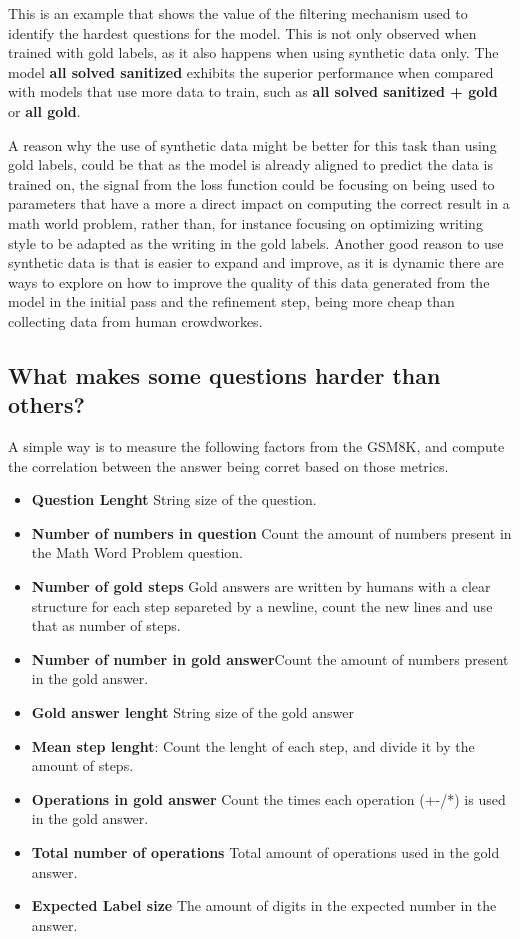 \documentclass[a4paper,10pt]{article}
\begin{document}
This is an example that shows the value of the filtering mechanism used to identify the hardest questions for the model. This is not only observed when trained with gold labels, as it also happens when using synthetic data only. The model \textbf{all solved sanitized} exhibits the superior performance when compared with models that use more data to train, such as \textbf{all solved sanitized + gold} or \textbf{all gold}.

A reason why the use of synthetic data might be better for this task than using gold labels, could be that as the model is already aligned to predict the data is trained on, the signal from the loss function could be focusing on being used to parameters that have a more a direct impact on computing the correct result in a math world problem, rather than, for instance focusing on optimizing writing style to be adapted as the writing in the gold labels. Another good reason to use synthetic data is that is easier to expand and improve, as it is dynamic there are ways to explore on how to improve the quality of this data generated from the model in the initial pass and the refinement step, being more cheap than collecting data from human crowdworkes. 

\subsection{What makes some questions harder than others?}
A simple way is to measure the following factors from the GSM8K, and compute the correlation between the answer being corret based on those metrics.

\begin{itemize}
 \item \textbf{Question Lenght} String size of the question.
 \item \textbf{Number of numbers in question} Count the amount of numbers present in the Math Word Problem question.
 \item \textbf{Number of gold steps} Gold answers are written by humans with a clear structure for each step separeted by a newline, count the new lines and use that as number of steps.
 \item \textbf{Number of number in gold answer}Count the amount of numbers present in the gold answer.
 \item \textbf{Gold answer lenght} String size of the gold answer
 \item \textbf{Mean step lenght}: Count the lenght of each step, and divide it by the amount of steps.
 \item \textbf{Operations in gold answer} Count the times each operation (+-/*) is used in the gold answer.
 \item \textbf{Total number of operations} Total amount of operations used in the gold answer.
 \item \textbf{Expected Label size} The amount of digits in the expected number in the answer.
\end{itemize}
\end{document}
